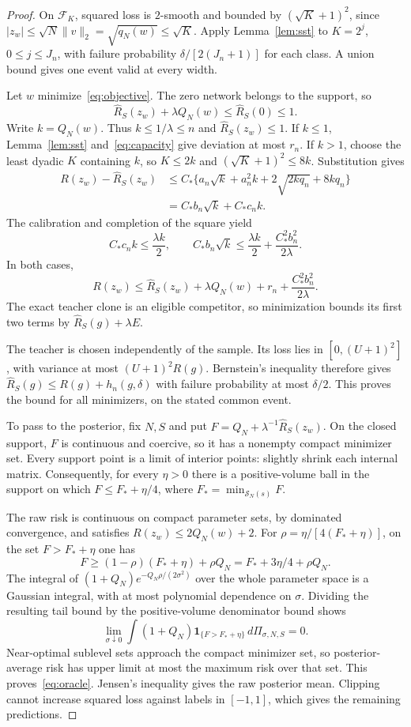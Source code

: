 \documentclass[11pt]{article}
\theoremstyle{definition}\newtheorem{definition}[theorem]{Definition}
\theoremstyle{remark}\newtheorem{remark}[theorem]{Remark}
\begin{document}
\begin{proof}
On $\mathcal F_K$, squared loss is $2$-smooth and bounded by $(\sqrt K+1)^2$, since $|z_w|\leq\sqrt N\|v\|_2=\sqrt{q_N(w)}\leq\sqrt K$. Apply Lemma~\ref{lem:sst} to $K=2^j$, $0\leq j\leq J_n$, with failure probability $\delta/[2(J_n+1)]$ for each class. A union bound gives one event valid at every width.

Let $w$ minimize~\eqref{eq:objective}. The zero network belongs to the support, so
\[
 \widehat R_S(z_w)+\lambda Q_N(w)\leq\widehat R_S(0)\leq1.
\]
Write $k=Q_N(w)$. Thus $k\leq1/\lambda\leq n$ and $\widehat R_S(z_w)\leq1$. If $k\leq1$, Lemma~\ref{lem:sst} and~\eqref{eq:capacity} give deviation at most $r_n$. If $k>1$, choose the least dyadic $K$ containing $k$, so $K\leq2k$ and $(\sqrt K+1)^2\leq8k$. Substitution gives
\begin{align*}
 R(z_w)-\widehat R_S(z_w)
 &\leq C_*\{a_n\sqrt k+a_n^2k+2\sqrt{2kq_n}+8kq_n\}\\
 &=C_*b_n\sqrt k+C_*c_n k.
\end{align*}
The calibration and completion of the square yield
\[
 C_*c_n k\leq\frac{\lambda k}{2},\qquad
 C_*b_n\sqrt k\leq\frac{\lambda k}{2}
                         +\frac{C_*^2b_n^2}{2\lambda}.
\]
In both cases,
\[
 R(z_w)\leq\widehat R_S(z_w)+\lambda Q_N(w)
                       +r_n+\frac{C_*^2b_n^2}{2\lambda}.
\]
The exact teacher clone is an eligible competitor, so minimization bounds its first two terms by $\widehat R_S(g)+\lambda E$.

The teacher is chosen independently of the sample. Its loss lies in $[0,(U+1)^2]$, with variance at most $(U+1)^2R(g)$. Bernstein's inequality therefore gives $\widehat R_S(g)\leq R(g)+h_n(g,\delta)$ with failure probability at most $\delta/2$. This proves the bound for all minimizers, on the stated common event.

To pass to the posterior, fix $N,S$ and put $F=Q_N+\lambda^{-1}\widehat R_S(z_w)$. On the closed support, $F$ is continuous and coercive, so it has a nonempty compact minimizer set. Every support point is a limit of interior points: slightly shrink each internal matrix. Consequently, for every $\eta>0$ there is a positive-volume ball in the support on which $F\leq F_*+\eta/4$, where $F_*=\min_{\mathcal S_N(s)}F$.

The raw risk is continuous on compact parameter sets, by dominated convergence, and satisfies $R(z_w)\leq2Q_N(w)+2$. For $\rho=\eta/[4(F_*+\eta)]$, on the set $F>F_*+\eta$ one has
\[
 F\geq (1-\rho)(F_*+\eta)+\rho Q_N
      =F_*+3\eta/4+\rho Q_N.
\]
The integral of $(1+Q_N)e^{-Q_N\rho/(2\sigma^2)}$ over the whole parameter space is a Gaussian integral, with at most polynomial dependence on $\sigma$. Dividing the resulting tail bound by the positive-volume denominator bound shows
\[
 \lim_{\sigma\downarrow0}\int(1+Q_N)
       \mathbf1_{\{F>F_*+\eta\}}\,d\Pi_{\sigma,N,S}=0.
\]
Near-optimal sublevel sets approach the compact minimizer set, so posterior-average risk has upper limit at most the maximum risk over that set. This proves~\eqref{eq:oracle}. Jensen's inequality gives the raw posterior mean. Clipping cannot increase squared loss against labels in $[-1,1]$, which gives the remaining predictions.
\end{proof}
\end{document}
